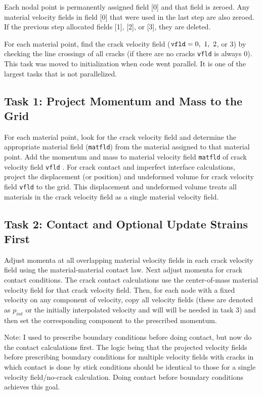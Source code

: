 \documentclass[11pt]{article}
\begin{document}
Each nodal point is permanently assigned field [0] and that field is zeroed. Any material velocity fields in field [0] that were used in the last step are also zeroed. If the previous step allocated fields [1], [2], or [3], they are deleted. 

For each material point, find the crack velocity field (${\tt vfld}=0,\ 1,\ 2$, or $3$) by checking the line crossings of all cracks (if there are no cracks {\tt vfld} is always 0). This task was moved to initialization when code went parallel. It is one of the largest tasks that is not parallelized.

\subsection{Task 1: Project Momentum and Mass to the Grid}

For each material point, look for the crack velocity field and determine the appropriate material field ({\tt matfld}) from the material assigned to that material point. Add the momentum and mass to material velocity field {\tt matfld} of crack velocity field {\tt vfld} . For crack contact and imperfect interface calculations, project the displacement (or position) and undeformed volume for crack velocity field {\tt vfld} to the grid. This displacement and undeformed volume treats all materials in the crack velocity field as a single material velocity field.

\subsection{Task 2: Contact and Optional Update Strains First}

Adjust momenta at all overlapping material velocity fields in each crack velocity field using the material-material contact law. Next adjust momenta for crack contact conditions. The crack contact calculations use the center-of-mass material velocity field for that crack velocity field. Then, for each node with a fixed velocity on any component of velocity, copy all velocity fields (these are denoted as $p_{int}$ or the initially interpolated velocity and will will be needed in task 3) and then set the corresponding component to the prescribed momentum.

Note: I used to prescribe boundary conditions before doing contact, but now do the contact calculations first. The logic being that the projected velocity fields before prescribing boundary conditions for multiple velocity fields with cracks in which contact is done by stick conditions should be identical to those for a single velocity field/no-crack calculation. Doing contact before boundary conditions achieves this goal.
\end{document}
